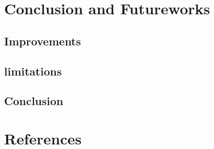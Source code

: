 \documentclass{article}
\begin{document}
\newpage
\section{Conclusion and Futureworks}
\subsection{Improvements}
\subsection{limitations}
\subsection{Conclusion}



\newpage
\section*{References}
\vspace*{-35pt}
\renewcommand{\refname}{}
\end{document}
